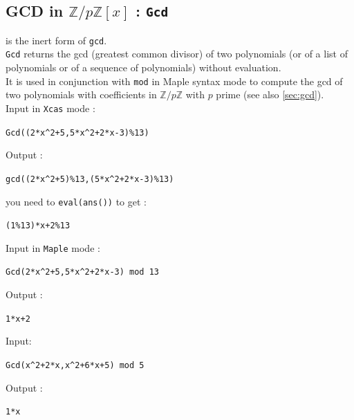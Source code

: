 \documentclass[a4paper,11pt]{book}
\newcommand{\Z}{{\mathbb{Z}}}
\begin{document}
\subsection{GCD in $\Z/p\Z[x]$ : {\tt Gcd}}
  is the inert form of  {\tt gcd}.\\
{\tt Gcd} returns the gcd (greatest common divisor) of two polynomials
(or of a list of polynomials or of a sequence of polynomials) without
evaluation.\\ 
It is used in conjunction with {\tt mod} in Maple syntax mode to compute
the gcd of two polynomials with coefficients in $\Z/p\Z$ with $p$ prime
(see also \ref{sec:gcd}).\\
Input in {\tt Xcas} mode :
\begin{center}{\tt Gcd((2*x\verb|^|2+5,5*x\verb|^|2+2*x-3)\%13)}\end{center}
Output :
\begin{center}{\tt gcd((2*x\verb|^|2+5)\%13,(5*x\verb|^|2+2*x-3)\%13)}\end{center}
you need to {\tt eval(ans())} to get :
\begin{center}{\tt (1\%13)*x+2\%13}\end{center}
Input in {\tt Maple} mode :
\begin{center}{\tt Gcd(2*x\verb|^|2+5,5*x\verb|^|2+2*x-3) mod 13}\end{center}
Output :
\begin{center}{\tt 1*x+2}\end{center}
Input:
\begin{center}{\tt Gcd(x\verb|^|2+2*x,x\verb|^|2+6*x+5) mod 5}\end{center}
Output :
\begin{center}{\tt 1*x}\end{center}
\end{document}
